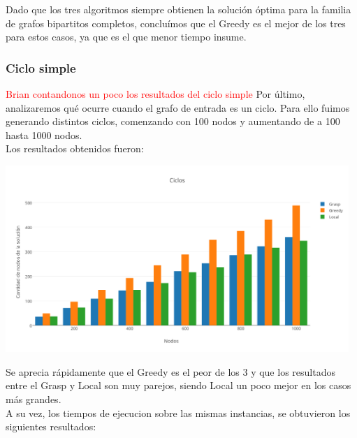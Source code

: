 Dado que los tres algoritmos siempre obtienen la solución óptima para la familia de grafos bipartitos completos, concluímos que el Greedy es el mejor de los tres para estos casos, ya que es el que menor tiempo insume. 

\subsubsection{Ciclo simple}

\textcolor{red}{Brian contandonos un poco los resultados del ciclo simple}
Por \'ultimo, analizaremos qu\'e ocurre cuando el grafo de entrada es un ciclo. Para ello fuimos generando distintos ciclos, comenzando con 100 nodos y aumentando de a 100 hasta 1000 nodos.\\
Los resultados obtenidos fueron:\\

\begin{center}
 \includegraphics[width=13cm, keepaspectratio=yes]{imagenes/6/Ciclos.png}
\end{center}

Se aprecia r\'apidamente que el Greedy es el peor de los 3 y que los resultados entre el Grasp y Local son muy parejos, siendo Local un poco mejor en los casos m\'as grandes.\\

A su vez, los tiempos de ejecucion sobre las mismas instancias, se obtuvieron los siguientes resultados:

